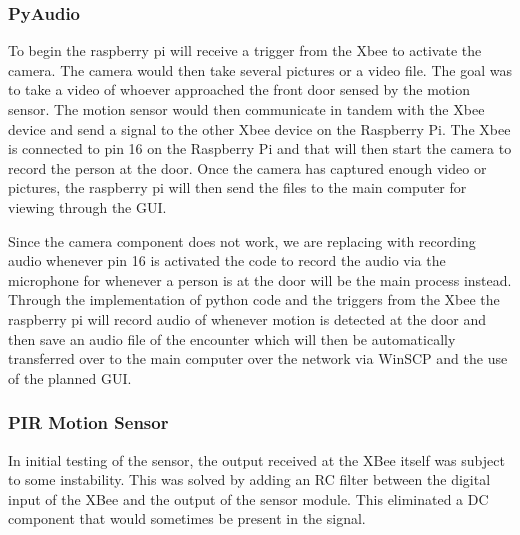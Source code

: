 		\subsubsection{PyAudio}
		\par To begin the raspberry pi will receive a trigger from the Xbee to activate the camera. The camera would then take several pictures or a video file. The goal was to take a video of whoever approached the front door sensed by the motion sensor. The motion sensor would then communicate in tandem with the Xbee device and send a signal to the other Xbee device on the Raspberry Pi. The Xbee is connected to pin 16 on the Raspberry Pi and that will then start the camera to record the person at the door. Once the camera has captured enough video or pictures, the raspberry pi will then send the files to the main computer for viewing through the GUI. 
		\par Since the camera component does not work, we are replacing with recording audio whenever pin 16 is activated the code to record the audio via the microphone for whenever a person is at the door will be the main process instead. Through the implementation of python code and the triggers from the Xbee the raspberry pi will record audio of whenever motion is detected at the door and then save an audio file of the encounter which will then be automatically transferred over to the main computer over the network via WinSCP and the use of the planned GUI.
		
		\subsubsection{PIR Motion Sensor}
		\par In initial testing of the sensor, the output received at the XBee itself was subject to some instability. This was solved by adding an RC filter between the digital input of the XBee and the output of the sensor module. This eliminated a DC component that would sometimes be present in the signal. 